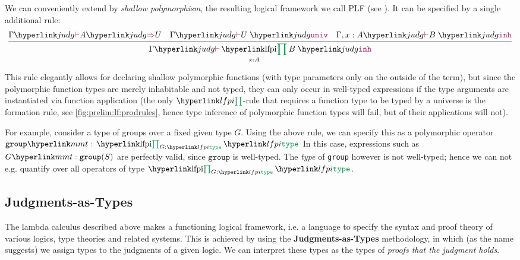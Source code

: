 \begin{remark}\label{remark:lf:lfx:plf}
We can conveniently extend \LF by \emph{shallow polymorphism}, the resulting logical framework we call \textsf{PLF} (see \cite{rabe:recon:17}).  It can be specified  by a single additional rule:
\[\irule{\gjudg{\infertype A U} \quad \gjudg{\judguniv U} \quad \judg{\Gamma,x:A}{\judginh B} }{\gjudg{\judginh{\lfpi{x:A}B}}}\]

This rule elegantly allows for declaring shallow polymorphic functions (with type parameters only on the outside of the term), but since the polymorphic function types are merely inhabitable and not typed, they can only occur in well-typed expressions if the type arguments are instantiated via function application (the only $\lfpisym$-rule that requires a function type to be typed by a universe is the formation rule, see \autoref{fig:prelim:lf:prodrules}, hence type inference of polymorphic function types will fail, but of their applications will not).

For example, consider a type of groups over a fixed given type $G$. Using the above rule, we can specify this as a polymorphic operator
$\mathtt{group}\mmttp{\lfpi{G:\type}\type}$
In this case, expressions such as $G\mmttp{\mathtt{group}(S)}$ are perfectly valid, since $\mathtt{group}$ is well-typed. The \emph{type} of \texttt{group} however is not well-typed; hence we can not e.g. quantify over all operators of type $\lfpi{G:\type}\type$.
\end{remark}

\subsection{Judgments-as-Types}\label{sec:prelim:lf:jat}

The lambda calculus described above makes \LF a functioning logical framework, i.e. a language to specify the syntax and proof theory of various logics, type theories and related systems. This is achieved by using the \hypertarget{jat}{\textbf{Judgments-as-Types}} methodology, in which (as the name suggests) we assign types to the judgments of a given logic. We can interpret these types as the types of \emph{proofs that the judgment holds}.

